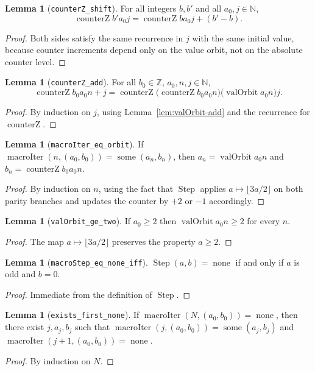 \documentclass[11pt,a4paper]{article}
\theoremstyle{definition}
\newtheorem{lemma}[definition]{Lemma}
\newcommand{\Nat}{\mathbb{N}}
\newcommand{\macroStep}{\operatorname{Step}}
\newcommand{\some}{\operatorname{some}}
\newcommand{\none}{\operatorname{none}}
\newcommand{\valOrbit}{\operatorname{valOrbit}}
\newcommand{\counterZ}{\operatorname{counterZ}}
\newcommand{\macroIter}{\operatorname{macroIter}}
\newcommand{\ZZ}{\mathbb{Z}}
\begin{document}
\begin{lemma}[\texttt{counterZ\_shift}]
\label{lem:counterZ-shift}
For all integers $b,b'$ and all $a_0,j\in\Nat$,
\[
  \counterZ{b'}{a_0}{j}=\counterZ{b}{a_0}{j}+(b'-b).
\]
\end{lemma}
\begin{proof}
Both sides satisfy the same recurrence in $j$ with the same initial value,
because counter increments depend only on the value orbit, not on the
absolute counter level.
\end{proof}

\begin{lemma}[\texttt{counterZ\_add}]
\label{lem:counterZ-add}
For all $b_0\in\ZZ$, $a_0,n,j\in\Nat$,
\[
  \counterZ{b_0}{a_0}{n+j}
  =
  \counterZ{\bigl(\counterZ{b_0}{a_0}{n}\bigr)}{\bigl(\valOrbit{a_0}{n}\bigr)}{j}.
\]
\end{lemma}
\begin{proof}
By induction on $j$, using Lemma~\ref{lem:valOrbit-add} and the recurrence
for $\counterZ{}{}{}$.
\end{proof}

\begin{lemma}[\texttt{macroIter\_eq\_orbit}]
\label{lem:macroiter-eq-orbit}
If $\macroIter(n,(a_0,b_0))=\some(a_n,b_n)$, then
$a_n=\valOrbit{a_0}{n}$ and $b_n=\counterZ{b_0}{a_0}{n}$.
\end{lemma}
\begin{proof}
By induction on $n$, using the fact that $\macroStep$ applies
$a\mapsto\lfloor3a/2\rfloor$ on both parity branches and updates the
counter by $+2$ or $-1$ accordingly.
\end{proof}

\begin{lemma}[\texttt{valOrbit\_ge\_two}]
\label{lem:valOrbit-ge-two}
If $a_0\ge2$ then $\valOrbit{a_0}{n}\ge2$ for every $n$.
\end{lemma}
\begin{proof}
The map $a\mapsto\lfloor3a/2\rfloor$ preserves the property $a\ge2$.
\end{proof}

\begin{lemma}[\texttt{macroStep\_eq\_none\_iff}]
\label{lem:macroStep-none}
$\macroStep(a,b)=\none$ if and only if $a$ is odd and $b=0$.
\end{lemma}
\begin{proof}
Immediate from the definition of $\macroStep$.
\end{proof}

\begin{lemma}[\texttt{exists\_first\_none}]
\label{lem:first-none}
If $\macroIter(N,(a_0,b_0))=\none$, then there exist $j,a_j,b_j$ such
that $\macroIter(j,(a_0,b_0))=\some(a_j,b_j)$ and
$\macroIter(j+1,(a_0,b_0))=\none$.
\end{lemma}
\begin{proof}
By induction on $N$.
\end{proof}
\end{document}
